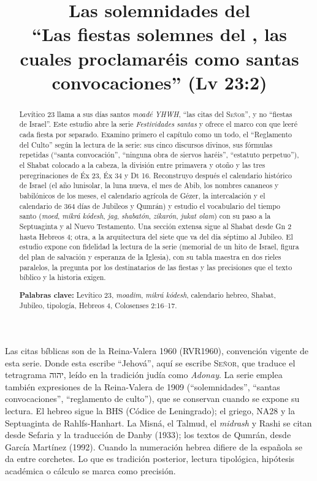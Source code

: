 \documentclass[11pt,letterpaper]{article}
\title{\color{tierraroja}\bfseries Las solemnidades del \SENOR\\[4pt]\large\color{sepia}\mdseries ``Las fiestas solemnes del \SENOR, las cuales proclamaréis como santas convocaciones'' (Lv 23:2)}
\author{}\date{}
\newcommand{\heb}[1]{\mbox{\foreignlanguage{hebrew}{#1}}}
\newcommand{\SENOR}{\textsc{Señor}}
\begin{document}
\maketitle\thispagestyle{empty}

\begin{abstract}\noindent
Levítico 23 llama a sus días santos \emph{moadé YHWH}, ``las citas del \SENOR'', y no ``fiestas de Israel''. Este estudio abre la serie \emph{Festividades santas} y ofrece el marco con que leeré cada fiesta por separado. Examino primero el capítulo como un todo, el ``Reglamento del Culto'' según la lectura de la serie: sus cinco discursos divinos, sus fórmulas repetidas (``santa convocación'', ``ninguna obra de siervos haréis'', ``estatuto perpetuo''), el Shabat colocado a la cabeza, la división entre primavera y otoño y las tres peregrinaciones de Éx 23, Éx 34 y Dt 16. Reconstruyo después el calendario histórico de Israel (el año lunisolar, la luna nueva, el mes de Abib, los nombres cananeos y babilónicos de los meses, el calendario agrícola de Gézer, la intercalación y el calendario de 364 días de Jubileos y Qumrán) y estudio el vocabulario del tiempo santo (\emph{moed}, \emph{mikrá kódesh}, \emph{jag}, \emph{shabatón}, \emph{zikarón}, \emph{jukat olam}) con su paso a la Septuaginta y al Nuevo Testamento. Una sección extensa sigue al Shabat desde Gn 2 hasta Hebreos 4; otra, a la arquitectura del siete que va del día séptimo al Jubileo. El estudio expone con fidelidad la lectura de la serie (memorial de un hito de Israel, figura del plan de salvación y esperanza de la Iglesia), con su tabla maestra en dos rieles paralelos, la pregunta por los destinatarios de las fiestas y las precisiones que el texto bíblico y la historia exigen.
\par\smallskip\noindent\textbf{Palabras clave:} Levítico 23, \emph{moadim}, \emph{mikrá kódesh}, calendario hebreo, Shabat, Jubileo, tipología, Hebreos 4, Colosenses 2:16--17.\end{abstract}

\begin{nota}
Las citas bíblicas son de la Reina-Valera 1960 (RVR1960), convención vigente de esta serie. Donde esta escribe ``Jehová'', aquí se escribe \SENOR, que traduce el tetragrama \heb{יהוה}, leído en la tradición judía como \emph{Adonay}. La serie emplea también expresiones de la Reina-Valera de 1909 (``solemnidades'', ``santas convocaciones'', ``reglamento de culto''), que se conservan cuando se expone su lectura. El hebreo sigue la BHS (Códice de Leningrado); el griego, NA28 y la Septuaginta de Rahlfs-Hanhart. La Misná, el Talmud, el \emph{midrash} y Rashi se citan desde Sefaria y la traducción de Danby (1933); los textos de Qumrán, desde García Martínez (1992). Cuando la numeración hebrea difiere de la española se da entre corchetes. Lo que es tradición posterior, lectura tipológica, hipótesis académica o cálculo se marca como precisión.
\end{nota}
\end{document}
